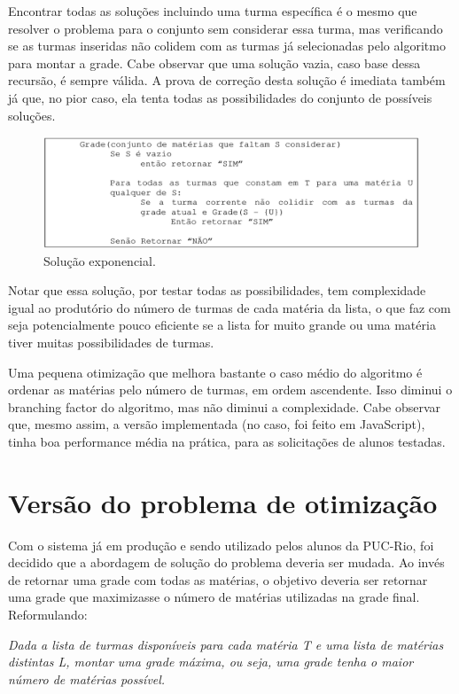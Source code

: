 \documentclass[graduacao,brazil]{ThesisPUC}
\begin{document}
Encontrar todas as soluções incluindo uma turma específica é o mesmo que resolver o problema para o conjunto sem considerar essa turma, mas verificando se as turmas inseridas não colidem com as turmas já selecionadas pelo algoritmo para montar a grade. Cabe observar que uma solução vazia, caso base dessa recursão, é sempre válida. A prova de correção desta solução é imediata também já que, no pior caso, ela tenta todas as possibilidades do conjunto de possíveis soluções.

\begin{figure}[H]
    \centering
    \includegraphics[width=\linewidth]{img/algoritmo_grade.png}
    \caption{Solução exponencial.}
\end{figure}

Notar que essa solução, por testar todas as possibilidades, tem complexidade igual ao produtório do número de turmas de cada matéria da lista, o que faz com seja potencialmente pouco eficiente se a lista for muito grande ou uma matéria tiver muitas possibilidades de turmas.

Uma pequena otimização que melhora bastante o caso médio do algoritmo é ordenar as matérias pelo número de turmas, em ordem ascendente. Isso diminui o branching factor do algoritmo, mas não diminui a complexidade. Cabe observar que, mesmo assim, a versão implementada (no caso, foi feito em JavaScript), tinha boa performance média na prática, para as solicitações de alunos testadas.

\section{Versão do problema de otimização}

Com o sistema já em produção e sendo utilizado pelos alunos da PUC-Rio, foi decidido que a abordagem de solução do problema deveria ser mudada. Ao invés de retornar uma grade com todas as matérias, o objetivo deveria ser retornar uma grade que maximizasse o número de matérias utilizadas na grade final. Reformulando:

\vspace{3 mm}
\textit{Dada a lista de turmas disponíveis para cada matéria T e uma lista de matérias distintas L, montar uma grade máxima, ou seja, uma grade tenha o maior número de matérias possível.}
\vspace{3 mm}
\end{document}
